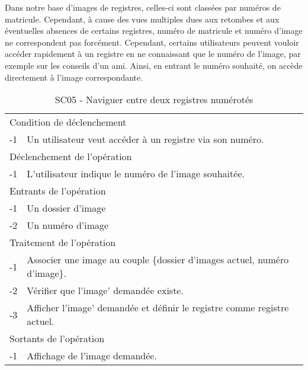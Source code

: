 \documentclass[a4paper]{article}
\begin{document}

Dans notre base d'images de registres, celles-ci sont classées par numéros de matricule. Cependant, à cause des vues multiples dues aux retombes et aux éventuelles absences de certains registres, numéro de matricule et numéro d'image ne correspondent pas forcément. Cependant, certains utilisateurs peuvent vouloir accéder rapidement à un registre en ne connaissant que le numéro de l'image, par exemple sur les conseils d'un ami. Ainsi, en entrant le numéro souhaité, on accède directement à l'image correspondante.

\begin{table}[H]
  \centering
   \small
  \begin{tabular}{|c|p{12cm}|}
      \hline
        \rowcolor{lightgray}\multicolumn{2}{|c|}{\textbf{SC05 - Naviguer entre deux registres numérotés}} \\
      \hline
        \multicolumn{2}{|l|}{Condition de d\'eclenchement} \\
      \hline
      -1 & Un utilisateur veut acc\'eder \`a un registre via son numéro. \\
      \hline
        \multicolumn{2}{|l|}{D\'eclenchement de l'op\'eration} \\
      \hline
        -1 & L'utilisateur indique le numéro de l'image souhaitée. \\
      \hline
        \multicolumn{2}{|l|}{Entrants de l'op\'eration} \\
      \hline
        -1 & Un dossier d'image \\
          -2 & Un numéro d'image \\ 
      \hline
        \multicolumn{2}{|l|}{Traitement de l'op\'eration} \\
      \hline
        -1 & Associer une image au couple \{dossier d'images actuel, numéro d'image\}.  \\
          -2 & V\'erifier que l'image' demand\'ee existe. \\
          -3 & Afficher l'image' demand\'ee et définir le registre comme registre actuel. \\
      \hline
        \multicolumn{2}{|l|}{Sortants de l'op\'eration} \\
      \hline
        -1 & Affichage de l'image demand\'ee. \\
      \hline
  \end{tabular}
  \caption{SC05 - Naviguer entre deux registres numérotés}
  \normalsize
  \label{tab:naviguer_deux_registres_numerotes}
\end{table}
\end{document}
